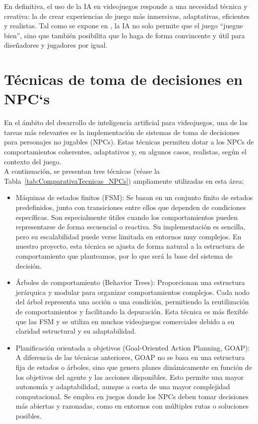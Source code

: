 En definitiva, el uso de la IA en videojuegos responde a una necesidad técnica y creativa: la de crear experiencias de juego más inmersivas, adaptativas, eficientes y realistas. Tal como se expone en \cite{YannakakisTogelius2018}, la IA no solo permite que el juego ``juegue bien'', sino que también posibilita que lo haga de forma convincente y útil para diseñadores y jugadores por igual.


\section{Técnicas de toma de decisiones en NPC`s}

En el ámbito del desarrollo de inteligencia artificial para videojuegos, una de las tareas más relevantes es la implementación de sistemas de toma de decisiones para personajes no jugables (NPCs). Estas técnicas permiten dotar a los NPCs de comportamientos coherentes, adaptativos y, en algunos casos, realistas, según el contexto del juego.\\

A continuación, se presentan tres técnicas (véase la Tabla~\ref{tab:ComparativaTecnicas_NPCs}) ampliamente utilizadas en esta área:
\begin{itemize}
\item Máquinas de estados finitos (FSM): Se basan en un conjunto finito de estados predefinidos, junto con transiciones entre ellos que dependen de condiciones específicas. Son especialmente útiles cuando los comportamientos pueden representarse de forma secuencial o reactiva. Su implementación es sencilla, pero su escalabilidad puede verse limitada en entornos muy complejos. En nuestro proyecto, esta técnica se ajusta de forma natural a la estructura de comportamiento que planteamos, por lo que será la base del sistema de decisión.
\item Árboles de comportamiento (Behavior Trees): Proporcionan una estructura jerárquica y modular para organizar comportamientos complejos. Cada nodo del árbol representa una acción o una condición, permitiendo la reutilización de comportamientos y facilitando la depuración. Esta técnica es más flexible que las FSM y se utiliza en muchos videojuegos comerciales debido a su claridad estructural y su adaptabilidad.
\item Planificación orientada a objetivos (Goal-Oriented Action Planning, GOAP): A diferencia de las técnicas anteriores, GOAP no se basa en una estructura fija de estados o árboles, sino que genera planes dinámicamente en función de los objetivos del agente y las acciones disponibles. Esto permite una mayor autonomía y adaptabilidad, aunque a costa de una mayor complejidad computacional. Se emplea en juegos donde los NPCs deben tomar decisiones más abiertas y razonadas, como en entornos con múltiples rutas o soluciones posibles.
\end{itemize}

